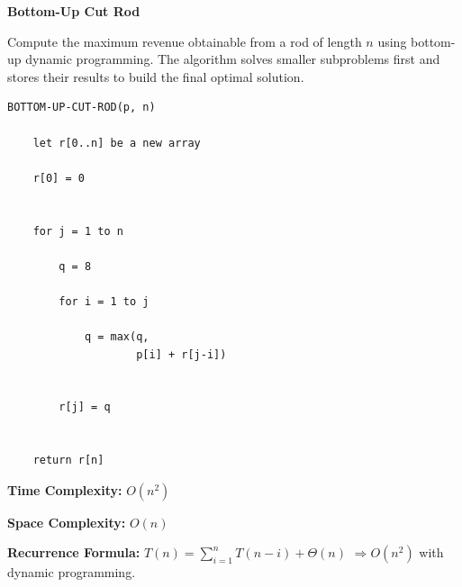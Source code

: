 \documentclass[a4paper,12pt]{article}
\begin{document}
\begin{tcolorbox}[
    colback=gray!30,
    colframe=black,
    boxrule=1pt,
    arc=0mm
]

\begin{tcolorbox}[
    colback=gray!10,
    colframe=black,
    arc=0mm
]
\centering
{\Huge\bfseries Bottom-Up Cut Rod}
\end{tcolorbox}


\begin{tcolorbox}[
    colback=gray!10,
    colframe=black,
    arc=0mm
]
\small
Compute the maximum revenue obtainable from a rod of length $n$
using bottom-up dynamic programming.
The algorithm solves smaller subproblems first and stores their results
to build the final optimal solution.
\end{tcolorbox}


\begin{tcolorbox}[
    colback=black!5,
    colframe=black,
    arc=0mm,
    title=Pseudo-code
]
\tiny
\begin{lstlisting}
BOTTOM-UP-CUT-ROD(p, n)

    let r[0..n] be a new array

    r[0] = 0


    for j = 1 to n

        q = 8

        for i = 1 to j

            q = max(q,
                    p[i] + r[j-i])


        r[j] = q


    return r[n]
\end{lstlisting}
\end{tcolorbox}


\begin{tcolorbox}[
    colback=cyan!20,
    colframe=black,
    arc=0mm
]
\small
\textbf{Time Complexity:}
$O(n^2)$
\end{tcolorbox}


\begin{tcolorbox}[
    colback=violet!20,
    colframe=black,
    arc=0mm
]
\small
\textbf{Space Complexity:}
$O(n)$
\end{tcolorbox}


\begin{tcolorbox}[
    colback=pink!20,
    colframe=black,
    arc=0mm
]
\small
\textbf{Recurrence Formula:}
$T(n)=\sum_{i=1}^{n}T(n-i)+\Theta(n)$
$\Rightarrow O(n^2)$ with dynamic programming.
\end{tcolorbox}

\end{tcolorbox}
\end{document}
